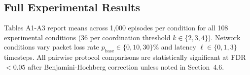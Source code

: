 \documentclass[pdflatex,sn-mathphys-num]{sn-jnl}%
\theoremstyle{thmstyleone}%
\theoremstyle{thmstyletwo}%
\theoremstyle{thmstylethree}%
\begin{document}

\bigskip
\newpage
\begin{appendices}

\appendix
\section{Full Experimental Results}
Tables A1-A3 report means across 1,000 episodes per condition for all 108 experimental conditions (36 per coordination threshold $k \in \{2, 3, 4\}$). Network conditions vary packet loss rate $p_{\text{base}} \in \{0, 10, 30\}\%$ and latency $\ell \in \{0, 1, 3\}$ timesteps. All pairwise protocol comparisons are statistically significant at FDR $< 0.05$ after Benjamini-Hochberg correction unless noted in Section~4.6.


\end{appendices}
\end{document}
